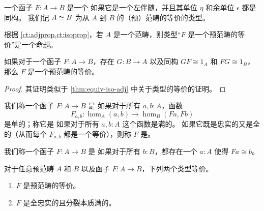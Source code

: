 \begin{defn}\label{ct:equiv}
  一个函子 $F:A\to B$ 是一个
  如果它是一个左伴随，并且其单位 $\eta$ 和余单位 $\epsilon$ 都是同构。
  我们记 $A \simeq B$ 为从 $A$ 到 $B$ 的（预）范畴的等价的类型。
\end{defn}

根据 \cref{ct:adjprop,ct:isoprop}，若 $A$ 是一个范畴，则类型``$F$ 是一个预范畴的等价''是一个命题。

\begin{lem}\label{ct:adjointification}
  如果对于一个函子 $F:A\to B$，存在 $G:B\to A$ 以及同构 $GF\cong 1_A$ 和 $FG\cong 1_B$，那么 $F$ 是一个预范畴的等价。
\end{lem}

\begin{proof}
  其证明类似于 \cref{thm:equiv-iso-adj} 中关于类型的等价的证明。
\end{proof}

\begin{defn}\label{ct:full-faithful}
  我们称一个函子 $F:A\to B$ 是
  如果对于所有 $a,b:A$，函数
  \[F_{a,b}:\hom_A(a,b) \to \hom_B(Fa,Fb)\]
  是单的；称它是
  如果对于所有 $a,b:A$ 这个函数是满的。
  如果它既是忠实的又是全的（从而每个 $F_{a,b}$ 都是一个等价），则称 $F$ 是。
\end{defn}

\begin{defn}\label{ct:split-essentially-surjective}
  我们称一个函子 $F:A\to B$ 是
  如果对于所有 $b:B$，都存在一个 $a:A$ 使得 $Fa\cong b$。
\end{defn}

\begin{lem}\label{ct:ffeso}
  对于任意预范畴 $A$ 和 $B$ 以及函子 $F:A\to B$，下列两个类型等价。
  \begin{enumerate}
  \item $F$ 是预范畴的等价。\label{item:ct:ffeso1}
  \item $F$ 是全忠实的且分裂本质满的。\label{item:ct:ffeso2}
  \end{enumerate}
\end{lem}

